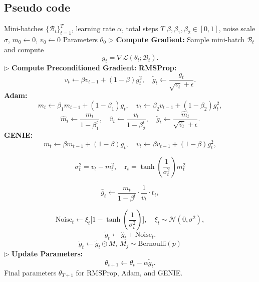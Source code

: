 \documentclass{article}
\theoremstyle{plain}
\theoremstyle{definition}
\theoremstyle{remark}
\begin{document}
\subsection{Pseudo code}
\label{pseudo code}
\begin{algorithm}[H]
   \caption{Unified Algorithm for RMSProp, Adam, and GENIE}
   \label{alg:unified}
\begin{algorithmic}
    Mini-batches $\{\mathcal{B}_t\}_{t=1}^T$, learning rate $\alpha$, total steps $T$
    $\beta, \beta_1, \beta_2 \in [0,1]$, noise scale $\sigma$, $m_0 \gets 0$, $v_0 \gets 0$
    Parameters $\theta_0$
      \STATE \(\triangleright\) {\bfseries Compute Gradient:} Sample mini-batch $\mathcal{B}_t$ and compute
    \[
    g_t = \nabla \mathcal{L}(\theta_t; \mathcal{B}_t).
    \]
      \STATE \(\triangleright\) {\bfseries Compute Preconditioned Gradient:}
      \STATE \textbf{RMSProp:}
      \[
         v_t \gets \beta v_{t-1} + (1-\beta) g_t^2, \quad \tilde{g}_t \gets \frac{g_t}{\sqrt{v_t} + \epsilon}.
      \]
      \STATE \textbf{Adam:}
      \[
         m_t \gets \beta_1 m_{t-1} + (1-\beta_1) g_t, \quad 
         v_t \gets \beta_2 v_{t-1} + (1-\beta_2) g_t^2,
      \]
      \[
         \hat{m}_t \gets \frac{m_t}{1-\beta_1^t}, \quad \hat{v}_t \gets \frac{v_t}{1-\beta_2^t}, \quad 
         \tilde{g}_t \gets \frac{\hat{m}_t}{\sqrt{\hat{v}_t} + \epsilon}.
      \]
      \STATE \textbf{GENIE:}
      \[
         m_t \gets \beta m_{t-1} + (1-\beta) g_t, \quad 
         v_t \gets \beta v_{t-1} + (1-\beta) g_t^2,
      \]
      
      \[
    \sigma_t^2= v_t - m_t^2, \quad 
    \text{r}_t = \tanh(\frac{1}{\sigma_t^2})m_t^2
    \]
    
    \[\hat{g}_t \gets \frac{m_t}{1-\beta^t} \cdot \frac{1}{v_t} \cdot \text{r}_t,\]
    
      \[
         \text{Noise}_t \gets \xi_t \bigl[1 - \tanh(\frac{1}{\sigma_t^2})\bigr], \quad \xi_t \sim \mathcal{N}(0, \sigma^2),
      \]
      \[
         \tilde{g}_t \gets \hat{g}_t + \text{Noise}_t.
      \]
      \[ 
    \tilde{g}_t \gets \tilde{g}_t \odot M, \, M_j \sim \text{Bernoulli}(p)
    \]
      \STATE \(\triangleright\) {\bfseries Update Parameters:}
      \[
      \theta_{t+1} \gets \theta_t - \alpha \tilde{g}_t.
      \]
   \ENDFOR
    Final parameters $\theta_{T+1}$ for RMSProp, Adam, and GENIE.
\end{algorithmic}
\end{algorithm}
\end{document}
